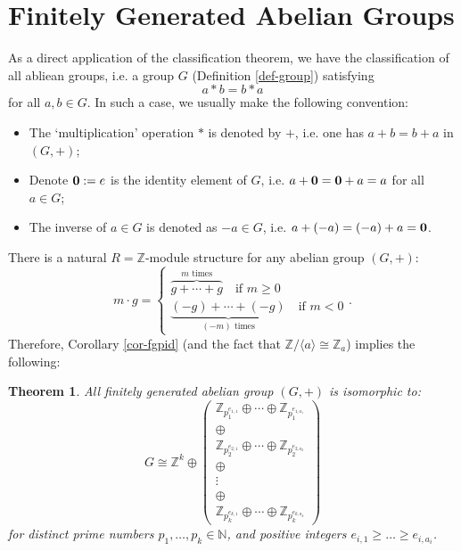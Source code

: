 \documentclass[12pt]{amsbook}
\newtheorem{theorem}{Theorem}[section]
\begin{document}
\section{Finitely Generated Abelian Groups}
As a direct application of the classification theorem, we have the classification of all abliean groups, i.e. a group $G$ (Definition \ref{def-group}) satisfying 
$$a \ast b = b \ast a$$
for all $a, b \in G$. In such a case, we usually make the following convention:
\begin{itemize}
    \item The `multiplication' operation $\ast$ is denoted by $+$, i.e. one has $a + b = b + a$ in $(G,+)$; 
    \item Denote ${\bf 0} := e$ is the identity element of $G$, i.e. $a + {\bf 0} = {\bf 0} + a = a$ for all $a \in G$;
    \item The inverse of $a \in G$ is denoted as $-a \in G$, i.e. $a + (-a) = (-a) + a = {\bf 0}$.
\end{itemize}

There is a natural $R=\mathbb{Z}$-module structure for any abelian group $(G,+)$:
$$m\cdot g = \begin{cases}
    \overbrace{g+\cdots+g}^{m\text{ times}}\quad\text{if }m\geq 0\\
    \underbrace{(-g)+\cdots+(-g)}_{(-m)\text{ times}}\quad\text{if }m<0
\end{cases}.$$
Therefore, Corollary \ref{cor-fgpid} (and the fact that $\mathbb{Z}/\langle a \rangle \cong \mathbb{Z}_{a}$) implies the following:
\begin{theorem}
    All finitely generated abelian group $(G,+)$ is isomorphic to:
$$G \cong \mathbb{Z}^k \oplus \begin{pmatrix} \mathbb{Z}_{p_1^{e_{1,1}}} \oplus \cdots \oplus \mathbb{Z}_{p_1^{e_{1,a_1}}}\\ 
\oplus \\
\mathbb{Z}_{p_2^{e_{2,1}}} \oplus \cdots \oplus \mathbb{Z}_{p_2^{e_{2,a_2}}}\\
\oplus \\
\vdots \\
\oplus \\
\mathbb{Z}_{p_k^{e_{k,1}}} \oplus \cdots \oplus \mathbb{Z}_{p_k^{e_{k,a_k}}} \end{pmatrix}$$
for distinct prime numbers $p_1, \dots, p_k \in \mathbb{N}$, and positive integers $e_{i,1} \geq \dots \geq e_{i,a_i}$.
\end{theorem}
\end{document}
